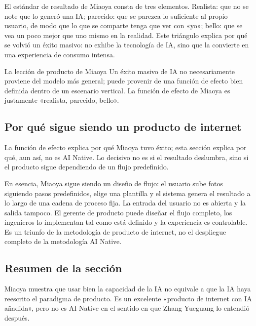 El estándar de resultado de Miaoya consta de tres elementos. Realista: que no se note que lo generó una IA; parecido: que se parezca lo suficiente al propio usuario, de modo que lo que se comparte tenga que ver con «yo»; bello: que se vea un poco mejor que uno mismo en la realidad. Este triángulo explica por qué se volvió un éxito masivo: no exhibe la tecnología de IA, sino que la convierte en una experiencia de consumo intensa.

\begin{importantbox}{La lección de producto de Miaoya}
Un éxito masivo de IA no necesariamente proviene del modelo más general; puede provenir de una función de efecto bien definida dentro de un escenario vertical. La función de efecto de Miaoya es justamente «realista, parecido, bello».
\end{importantbox}

\subsection{Por qué sigue siendo un producto de internet}

La función de efecto explica por qué Miaoya tuvo éxito; esta sección explica por qué, aun así, no es AI Native. Lo decisivo no es si el resultado deslumbra, sino si el producto sigue dependiendo de un flujo predefinido.

En esencia, Miaoya sigue siendo un diseño de flujo: el usuario sube fotos siguiendo pasos predefinidos, elige una plantilla y el sistema genera el resultado a lo largo de una cadena de proceso fija. La entrada del usuario no es abierta y la salida tampoco. El gerente de producto puede diseñar el flujo completo, los ingenieros lo implementan tal como está definido y la experiencia es controlable. Es un triunfo de la metodología de producto de internet, no el despliegue completo de la metodología AI Native.

\subsection{Resumen de la sección}

Miaoya muestra que usar bien la capacidad de la IA no equivale a que la IA haya reescrito el paradigma de producto. Es un excelente «producto de internet con IA añadida», pero no es AI Native en el sentido en que Zhang Yueguang lo entendió después.
